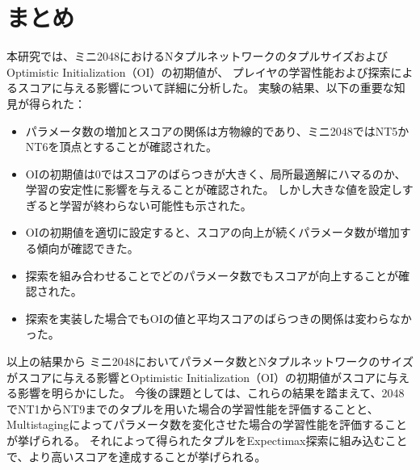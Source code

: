 \newpage
\section{まとめ}
本研究では、ミニ2048におけるNタプルネットワークのタプルサイズおよびOptimistic Initialization（OI）の初期値が、
プレイヤの学習性能および探索によるスコアに与える影響について詳細に分析した。
実験の結果、以下の重要な知見が得られた：
\begin{itemize}
\item パラメータ数の増加とスコアの関係は方物線的であり、ミニ2048ではNT5かNT6を頂点とすることが確認された。
\item OIの初期値は0ではスコアのばらつきが大きく、局所最適解にハマるのか、学習の安定性に影響を与えることが確認された。
しかし大きな値を設定しすぎると学習が終わらない可能性も示された。
\item OIの初期値を適切に設定すると、スコアの向上が続くパラメータ数が増加する傾向が確認できた。
\item 探索を組み合わせることでどのパラメータ数でもスコアが向上することが確認された。
\item 探索を実装した場合でもOIの値と平均スコアのばらつきの関係は変わらなかった。
\end{itemize}

以上の結果から
ミニ2048においてパラメータ数とNタプルネットワークのサイズがスコアに与える影響とOptimistic Initialization（OI）の初期値がスコアに与える影響を明らかにした。
今後の課題としては、これらの結果を踏まえて、2048でNT1からNT9までのタプルを用いた場合の学習性能を評価することと、
Multistagingによってパラメータ数を変化させた場合の学習性能を評価することが挙げられる。
それによって得られたタプルをExpectimax探索に組み込むことで、より高いスコアを達成することが挙げられる。
